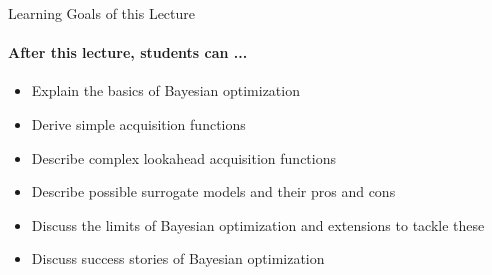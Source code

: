 \begin{frame}[c]{Learning Goals of this Lecture}
\framesubtitle{After this lecture, students can ...}

\begin{itemize}
    \item Explain the basics of Bayesian optimization
    \item Derive \alert{simple acquisition functions}
    \item Describe \alert{complex lookahead acquisition functions}
    \item Describe possible \alert{surrogate models} and their pros and cons 
    \item Discuss the \alert{limits of Bayesian optimization} and extensions to tackle these
    \item Discuss \alert{success stories} of Bayesian optimization
\end{itemize}

\end{frame}

%


%